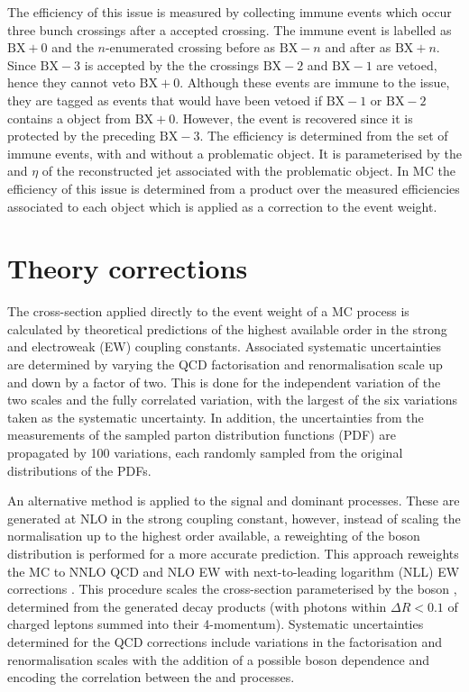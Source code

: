 The efficiency of this issue is measured by collecting immune events which occur three bunch crossings after a \HWT accepted crossing. The immune event is labelled as $\mathrm{BX}+0$ and the $n$-enumerated crossing before as $\mathrm{BX}-n$ and after as $\mathrm{BX}+n$. Since $\mathrm{BX}-3$ is accepted by the \HWT the crossings $\mathrm{BX}-2$ and $\mathrm{BX}-1$ are vetoed, hence they cannot veto $\mathrm{BX}+0$. Although these events are immune to the issue, they are tagged as events that would have been vetoed if $\mathrm{BX}-1$ or $\mathrm{BX}-2$ contains a \HWT object from $\mathrm{BX}+0$. However, the event is recovered since it is protected by the preceding $\mathrm{BX}-3$. The efficiency is determined from the set of immune events, with and without a problematic \HWT object. It is parameterised by the \pt and $\eta$ of the reconstructed jet associated with the problematic \HWT object. In MC the efficiency of this issue is determined from a product over the measured efficiencies associated to each object which is applied as a correction to the event weight.


\section{Theory corrections}\label{sec:theory-corrections}

The cross-section applied directly to the event weight of a MC process is
calculated by theoretical predictions of the highest available order in the
strong and electroweak (EW) coupling constants. Associated systematic
uncertainties are determined by varying the QCD factorisation and
renormalisation scale up and down by a factor of two. This is done for the independent variation of the two scales and the fully correlated variation, with the largest of the six variations taken as the systematic uncertainty. In addition, the uncertainties from the measurements
of the sampled \NNPDF parton distribution functions (PDF) \cite{Ball:2014uwa}
are propagated by 100 variations, each randomly sampled from the original
distributions of the PDFs.

An alternative method is applied to the signal and dominant \IVj processes.
These are generated at NLO in the strong coupling constant, however, instead
of scaling the normalisation up to the highest order available, a reweighting
of the boson \pt distribution is performed for a more accurate prediction.
This approach reweights the MC to NNLO QCD and NLO EW with next-to-leading
logarithm (NLL) EW corrections \cite{Lindert:2017olm}. This procedure scales
the cross-section parameterised by the boson \pt, determined from the
generated decay products (with photons within ${\Delta R<0.1}$ of charged
leptons summed into their 4-momentum). Systematic uncertainties determined for
the QCD corrections include variations in the factorisation and
renormalisation scales with the addition of a possible boson \pt dependence
and encoding the correlation between the \IZj and \IWj processes.

